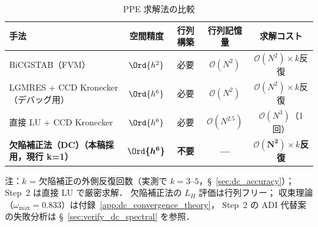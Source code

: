 \begin{table}[htbp]
\centering
\small
\caption{PPE 求解法の比較}
\label{tab:dc_ppe_methods}
\renewcommand{\arraystretch}{1.3}
\begin{tabular}{lcccc}
\toprule
手法 & 空間精度 & 行列構築 & 行列記憶量 & 求解コスト \\
\midrule
BiCGSTAB（FVM） & $\Ord{h^2}$ & 必要 & $\mathcal{O}(N^2)$ & $\mathcal{O}(N^2)\times k$反復 \\
LGMRES + CCD Kronecker（デバッグ用）& $\Ord{h^6}$ & 必要 & $\mathcal{O}(N^2)$ & $\mathcal{O}(N^2)\times k$反復 \\
直接 LU + CCD Kronecker & $\Ord{h^6}$ & 必要 & $\mathcal{O}(N^{2.5})$ & $\mathcal{O}(N^3)$（1回） \\
\textbf{欠陥補正法（DC）（本稿採用，現行 k=1）} & $\boldsymbol{\Ord{h^6}}$ & \textbf{不要} & \textbf{—} & $\boldsymbol{\mathcal{O}(N^2)}\times k$\textbf{反復} \\
\bottomrule
\end{tabular}

\smallskip
\noindent 注：$k$ = 欠陥補正の外側反復回数（実測で $k=3$--$5$，§~\ref{sec:dc_accuracy}）；
Step~2 は直接 LU で厳密求解．
欠陥補正法の $L_H$ 評価は行列フリー；
収束理論（$\omega_{\max} = 0.833$）は付録~\ref{app:dc_convergence_theory}，
Step~2 の ADI 代替案の失敗分析は §~\ref{sec:verify_dc_spectral} を参照．
\end{table}

